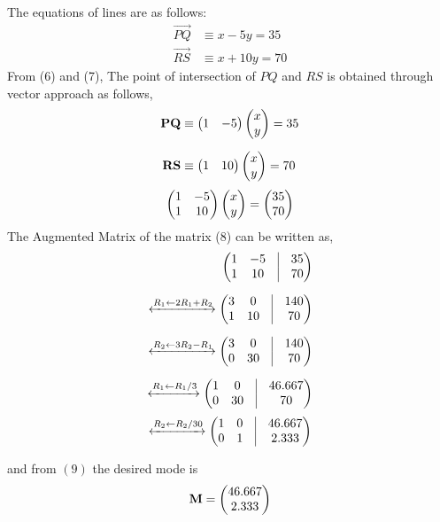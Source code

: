 \documentclass[journal,12pt,twocolumn]{IEEEtran}
\begin{document}
\begin{flushleft}
\begin{enumerate}
The equations of lines are as follows:\\
	\begin{align}
		\vec{PQ} &\equiv x - 5y = 35\\
		\vec{RS} &\equiv x + 10y = 70 
	\end{align}
%
From (6) and (7), The point of intersection of $PQ$ and $RS$ is obtained through vector approach as follows,\\
	\begin{align*}
		\mathbf{PQ} &\equiv \begin{pmatrix}1 & -5\end{pmatrix}\begin{pmatrix}x\\y\end{pmatrix}=35\\[6pt]
		\mathbf{RS} &\equiv \begin{pmatrix}1 & 10\end{pmatrix}\begin{pmatrix}x\\y\end{pmatrix}=70
	\end{align*}
%
	\begin{align}
		\begin{pmatrix}1 & -5 \\ 1 & 10\end{pmatrix}\begin{pmatrix}x\\y\end{pmatrix}=\begin{pmatrix}35\\70\end{pmatrix}
	\end{align}
%
The Augmented Matrix of the matrix (8) can be written as,
	\begin{align*}
		\myvec{ 1 & -5 & \vrule & 35 \\
				1 & 10 & \vrule & 70} \\[6pt]
%		
		\xleftrightarrow[]{R_1 \leftarrow 2R_1+R_2}
			\myvec{ 3 & 0 & \vrule & 140 \\
					1 & 10 & \vrule & 70} \\[6pt]
%
		\xleftrightarrow[]{R_2 \leftarrow 3R_2-R_1}
			\myvec{ 3 & 0 & \vrule & 140 \\
					0 & 30 & \vrule & 70} \\[6pt]
%
		\xleftrightarrow[]{R_1 \leftarrow R_1/3}
			\myvec{ 1 & 0 & \vrule & 46.667 \\
					0 & 30 & \vrule & 70} 
	\end{align*}
	\begin{align}
		\xleftrightarrow[]{R_2 \leftarrow R_2/30}
			\myvec{ 1 & 0 & \vrule & 46.667 \\
					0 & 1 & \vrule & 2.333} 
	\end{align}
		
	

and from $(9)$ the desired mode is
	\begin{align*}
		\mathbf{M} = \begin{pmatrix}46.667 \\ 2.333\end{pmatrix}
	\end{align*}


\end{enumerate}
\end{flushleft}
\end{document}
